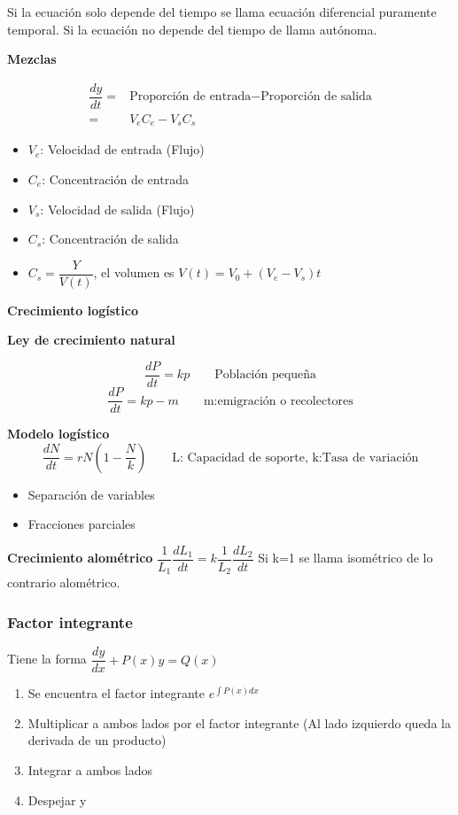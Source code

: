 Si la ecuación solo depende del tiempo se llama ecuación diferencial puramente temporal.
Si la ecuación no depende del tiempo de llama autónoma.

\textbf{Mezclas}

\begin{align*}
	\dfrac{dy}{dt}=&\text{Proporción de entrada}-\text{Proporción de salida} \\
	=& V_eC_e-V_sC_s
\end{align*}
\begin{itemize}
	\item $V_e$: Velocidad de entrada (Flujo)
	\item $C_e$: Concentración de entrada
	\item $V_s$: Velocidad de salida (Flujo)
	\item $C_s$: Concentración de salida
	\item $C_s=\dfrac{Y}{V(t)}$, el volumen es $V(t)=V_0+(V_e-V_s)t$ 
\end{itemize}

\textbf{Crecimiento logístico}

\textbf{Ley de crecimiento natural}

$$\dfrac{dP}{dt}=kp \qquad \text{Población pequeña}$$
$$\dfrac{dP}{dt}=kp-m \qquad \text{m:emigración o recolectores}$$

\textbf{Modelo logístico}
$$\dfrac{dN}{dt}=rN(1-\dfrac{N}{k}) \qquad \text{L: Capacidad de soporte, k:Tasa de variación}$$

\begin{itemize}
	\item Separación de variables
	\item Fracciones parciales
\end{itemize}

\textbf{Crecimiento alométrico}
$\dfrac{1}{L_1}\dfrac{dL_1}{dt}=k\dfrac{1}{L_2}\dfrac{dL_2}{dt}$ Si k=1 se llama isométrico de lo contrario alométrico.

\subsubsection{Factor integrante}
Tiene la forma $\dfrac{dy}{dx}+P(x)y=Q(x)$

\begin{enumerate}
	\item Se encuentra el factor integrante $e^{\int P(x)dx}$
	\item Multiplicar a ambos lados por el factor integrante (Al lado izquierdo queda la derivada de un producto)
	\item Integrar a ambos lados
	\item Despejar y
\end{enumerate}

